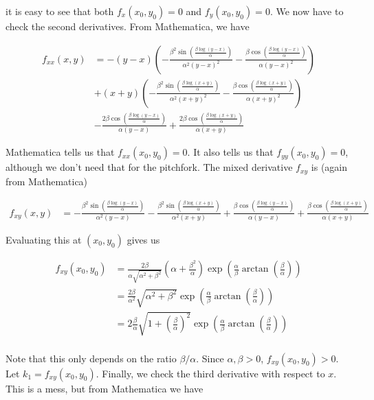 \documentclass[12pt]{article}
\begin{document}
\begin{enumerate}
it is easy to see that both $f_x(x_0, y_0) = 0$ and $f_y(x_0, y_0) = 0$. We now have to check the second derivatives. From Mathematica, we have

\begin{align*}
f_{xx}(x, y) &= -(y-x) \left(-\frac{\beta^2 \sin \left(\frac{\beta \log (y-x)}{\alpha}\right)}{\alpha^2 (y-x)^2}-\frac{\beta
   \cos \left(\frac{\beta \log (y-x)}{\alpha}\right)}{\alpha (y-x)^2}\right)\\
   &+(x+y) \left(-\frac{\beta^2
   \sin \left(\frac{\beta \log (x+y)}{\alpha}\right)}{\alpha^2 (x+y)^2}-\frac{\beta \cos \left(\frac{\beta
   \log (x+y)}{\alpha}\right)}{\alpha (x+y)^2}\right)\\
   &-\frac{2 \beta \cos \left(\frac{\beta \log
   (y-x)}{\alpha}\right)}{\alpha (y-x)}+\frac{2 \beta \cos \left(\frac{\beta \log (x+y)}{\alpha}\right)}{\alpha
   (x+y)}
\end{align*}

Mathematica tells us that $f_{xx}(x_0, y_0) = 0$. It also tells us that 
$f_{yy}(x_0, y_0) = 0$, although we don't need that for the pitchfork. The mixed derivative $f_{xy}$ is (again from Mathematica)

\begin{align*}
f_{xy}(x, y) &= -\frac{\beta^2 \sin \left(\frac{\beta \log (y-x)}{\alpha}\right)}{\alpha^2 (y-x)}-\frac{\beta^2 \sin
   \left(\frac{\beta \log (x+y)}{\alpha}\right)}{\alpha^2 (x+y)}+\frac{\beta \cos \left(\frac{\beta \log
   (y-x)}{\alpha}\right)}{\alpha (y-x)}+\frac{\beta \cos \left(\frac{\beta \log (x+y)}{\alpha}\right)}{\alpha (x+y)}
\end{align*}

Evaluating this at $(x_0, y_0)$ gives us

\begin{align*}
f_{xy}(x_0, y_0) &= \frac{2\beta}{\alpha\sqrt{\alpha^2 + \beta^2}} \left( \alpha + \frac{\beta^2}{\alpha} \right)\exp\left( \frac{\alpha}{\beta} \arctan \left( \frac{\beta}{\alpha}\right) \right) \\
&= \frac{2 \beta}{\alpha^2}\sqrt{ \alpha^2 + \beta^2 }
\exp\left( \frac{\alpha}{\beta} \arctan \left( \frac{\beta}{\alpha}\right) \right) \\
&= 2 \frac{\beta}{\alpha}\sqrt{ 1 + \left(\frac{\beta}{\alpha}\right)^2 }
\exp\left( \frac{\alpha}{\beta} \arctan \left( \frac{\beta}{\alpha}\right) \right) \\
\end{align*}

Note that this only depends on the ratio $\beta / \alpha$. Since $\alpha, \beta > 0$, $f_{xy}(x_0, y_0) > 0$. Let $k_1 = f_{xy}(x_0, y_0)$. Finally, we check the third derivative with respect to $x$. This is a mess, but from Mathematica we have


\end{enumerate}
\end{document}
